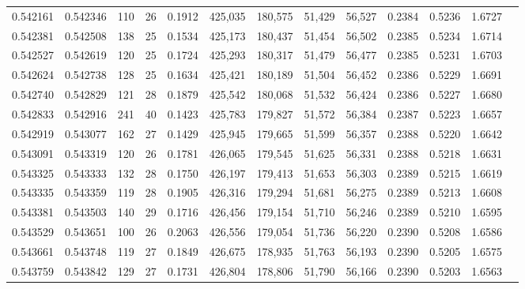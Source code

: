 \begin{tabular}{rrrrrrrrrrrrr}
0.542161 & 0.542346 &    110 &    26 &                                     0.1912 & 425,035 & 180,575 &  51,429 &  56,527 & 0.2384 & 0.5236 & 1.6727 \\
0.542381 & 0.542508 &    138 &    25 &                                     0.1534 & 425,173 & 180,437 &  51,454 &  56,502 & 0.2385 & 0.5234 & 1.6714 \\
0.542527 & 0.542619 &    120 &    25 &                                     0.1724 & 425,293 & 180,317 &  51,479 &  56,477 & 0.2385 & 0.5231 & 1.6703 \\
0.542624 & 0.542738 &    128 &    25 &                                     0.1634 & 425,421 & 180,189 &  51,504 &  56,452 & 0.2386 & 0.5229 & 1.6691 \\
0.542740 & 0.542829 &    121 &    28 &                                     0.1879 & 425,542 & 180,068 &  51,532 &  56,424 & 0.2386 & 0.5227 & 1.6680 \\
0.542833 & 0.542916 &    241 &    40 &                                     0.1423 & 425,783 & 179,827 &  51,572 &  56,384 & 0.2387 & 0.5223 & 1.6657 \\
0.542919 & 0.543077 &    162 &    27 &                                     0.1429 & 425,945 & 179,665 &  51,599 &  56,357 & 0.2388 & 0.5220 & 1.6642 \\
0.543091 & 0.543319 &    120 &    26 &                                     0.1781 & 426,065 & 179,545 &  51,625 &  56,331 & 0.2388 & 0.5218 & 1.6631 \\
0.543325 & 0.543333 &    132 &    28 &                                     0.1750 & 426,197 & 179,413 &  51,653 &  56,303 & 0.2389 & 0.5215 & 1.6619 \\
0.543335 & 0.543359 &    119 &    28 &                                     0.1905 & 426,316 & 179,294 &  51,681 &  56,275 & 0.2389 & 0.5213 & 1.6608 \\
0.543381 & 0.543503 &    140 &    29 &                                     0.1716 & 426,456 & 179,154 &  51,710 &  56,246 & 0.2389 & 0.5210 & 1.6595 \\
0.543529 & 0.543651 &    100 &    26 &                                     0.2063 & 426,556 & 179,054 &  51,736 &  56,220 & 0.2390 & 0.5208 & 1.6586 \\
0.543661 & 0.543748 &    119 &    27 &                                     0.1849 & 426,675 & 178,935 &  51,763 &  56,193 & 0.2390 & 0.5205 & 1.6575 \\
0.543759 & 0.543842 &    129 &    27 &                                     0.1731 & 426,804 & 178,806 &  51,790 &  56,166 & 0.2390 & 0.5203 & 1.6563 \\

\end{tabular}
